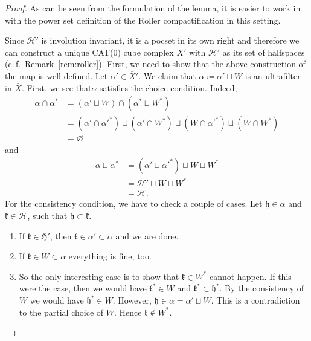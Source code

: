 \begin{proof}
  As can be seen from the formulation of the lemma, it is easier to work in with the power set definition of the Roller compactification in this setting.

  Since \(\mathcal{H}'\) is involution invariant, it is a pocset in its own right and therefore we can construct a unique CAT(0) cube complex \(X'\) with \(\mathcal{H}'\) as its set of halfspaces (c.\,f.\ Remark~\ref{rem:roller}). First, we need to show that the above construction of the map is well-defined. Let \(\alpha' \in \bar X'\). We claim that \(\alpha \coloneqq \alpha' \sqcup W\) is an ultrafilter in \(\bar X\). First, we see that\(\alpha\) satisfies the choice condition. Indeed,
  \begin{align*}
    \alpha \cap \alpha^\ast
    & = (\alpha' \sqcup W) \cap (\alpha^\ast \sqcup W^\ast)\\
    & = (\alpha' \cap \alpha'^\ast) \sqcup (\alpha' \cap W^\ast) \sqcup (W \cap \alpha'^\ast) \sqcup (W \cap W^\ast)\\
    & = \varnothing
  \end{align*}
  and
  \begin{align*}
    \alpha \sqcup \alpha^\ast
    & = (\alpha' \sqcup \alpha'^\ast) \sqcup W \sqcup W^\ast\\
    & = \mathcal{H}' \sqcup W \sqcup W^\ast\\
    & = \mathcal{H}.
  \end{align*}
  For the consistency condition, we have to check a couple of cases. Let \(\mathfrak{h} \in \alpha\) and \(\mathfrak{k} \in \mathcal{H}\), such that \(\mathfrak{h} \subset \mathfrak{k}\). 
  \begin{enumerate}
  \item If \(\mathfrak{k} \in \mathfrak{H}'\), then \(\mathfrak{k} \in \alpha' \subset \alpha\) and we are done.
  \item If \(\mathfrak{k} \in W \subset \alpha\) everything is fine, too. 
  \item So the only interesting case is to show that \(\mathfrak{k} \in W^\ast\) cannot happen. If this were the case, then we would have \(\mathfrak{k}^\ast \in W\) and \(\mathfrak{k}^\ast \subset \mathfrak{h}^\ast\). By the consistency of \(W\) we would have \(\mathfrak{h}^\ast \in W\). However, \(\mathfrak{h} \in \alpha = \alpha' \sqcup W\). This is a contradiction to the partial choice of \(W\). Hence \(\mathfrak{k} \notin W^\ast\).
  \end{enumerate}


\end{proof}
